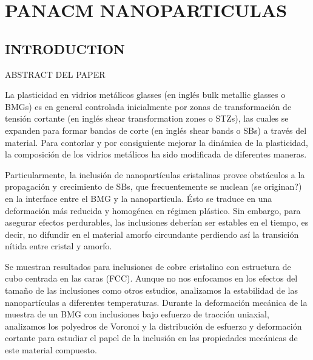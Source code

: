 
\chapter{PANACM NANOPARTICULAS} %

\label{C4} %



\section{INTRODUCTION}

ABSTRACT DEL PAPER

La plasticidad en vidrios metálicos glasses (en inglés bulk metallic glasses o BMGs) es en general controlada inicialmente por zonas de transformación de tensión cortante (en inglés shear transformation zones o STZs), las cuales se expanden para formar bandas de corte (en inglés shear bands o SBs) a través del material. Para contorlar y por consiguiente mejorar la dinámica de la plasticidad, la composición de los vidrios metálicos ha sido modificada de diferentes maneras.

Particularmente, la inclusión de nanopartículas cristalinas provee obstáculos a la propagación y crecimiento de SBs, que frecuentemente se nuclean (se originan?) en la interface entre el BMG y la nanopartícula. Ésto se traduce en una deformación más reducida y homogénea en régimen plástico. Sin embargo, para asegurar efectos perdurables, las inclusiones deberían ser estables en el tiempo, es decir, no difundir en el material amorfo circundante perdiendo así la transición nítida entre cristal y amorfo.

Se muestran resultados para inclusiones de cobre cristalino con estructura de cubo centrada en las caras (FCC). Aunque no nos enfocamos en los efectos del tamaño de las inclusiones como otros estudios, analizamos la estabilidad de las nanopartículas a diferentes temperaturas. Durante la deformación mecánica de la muestra de un BMG con inclusiones bajo esfuerzo de tracción uniaxial, analizamos los polyedros de Voronoi y la distribución de esfuerzo y deformación cortante para estudiar el papel de la inclusión en las propiedades mecánicas de este material compuesto.

